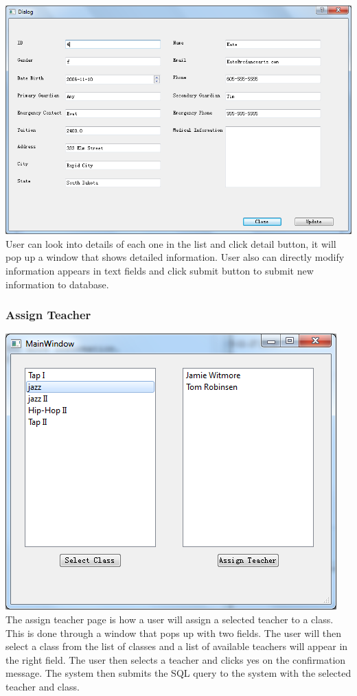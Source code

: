 \includegraphics[scale=0.5]{pics/detail.png}\\
User can look into details of each one in the list and click detail button, it will pop up a window that shows detailed information. User also can directly modify information appears in text fields and click submit button to submit new information to database.
\subsubsection{Assign Teacher}
\includegraphics[scale=0.5]{pics/assign_teacher.png}\\
The assign teacher page is how a user will assign a selected teacher to a class. This is done through a window that pops up with two fields. The user will then select a class from the list of classes and a list of available teachers will appear in the right field. The user then selects a teacher and clicks yes on the confirmation message. The system then submits the SQL query to the system with the selected teacher and class. 

